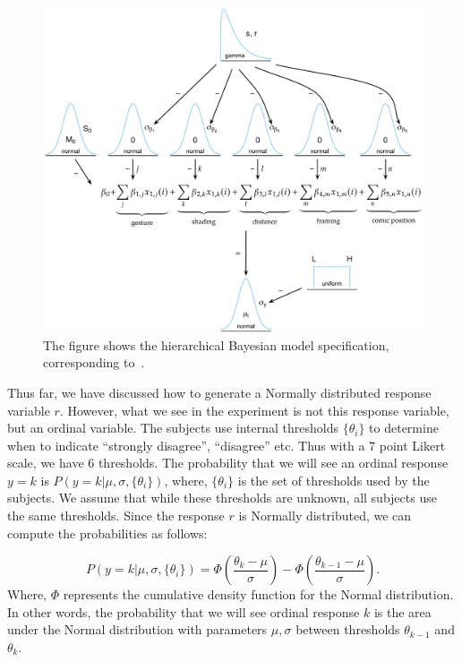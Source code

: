 \begin{figure}
 \includegraphics[width=\textwidth]{./figures/generative_model_main.pdf}
 \caption{The figure shows the hierarchical Bayesian model specification, corresponding to~.}
 \label{fig:generative-main}
\end{figure}

Thus far, we have discussed how to generate a Normally distributed response variable $r$. However, what we see in the experiment is not this response variable, but an ordinal variable. The subjects use internal thresholds $\{\theta_i\}$ to determine when to indicate ``strongly disagree'', ``disagree'' etc. Thus with a 7 point Likert scale, we have 6 thresholds. The probability that we will see an ordinal response $y=k$ is $P(y=k | \mu, \sigma, \{\theta_i\})$, where, $\{\theta_i\}$ is the set of thresholds used by the subjects. We assume that while these thresholds are unknown, all subjects use the same thresholds. Since the response $r$ is Normally distributed, we can compute the probabilities as follows:

\begin{equation}
 P(y=k | \mu, \sigma, \{\theta_i\}) = \Phi \left (\frac{\theta_k - \mu}{\sigma} \right) - \Phi \left(\frac{\theta_{k-1} - \mu}{\sigma} \right).
\end{equation}
Where, $\Phi$ represents the cumulative density function for the Normal distribution. In other words, the probability that we will see ordinal response $k$ is the area under the Normal distribution with parameters $\mu, \sigma$ between thresholds $\theta_{k-1}$ and $\theta_k$.

